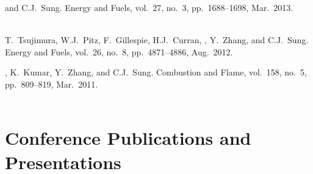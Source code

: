 \begin{bibmune}
    \item {} and C.J.\ Sung.  Energy and Fuels, vol.\ 27, no.\ 3,
    pp.\ 1688--1698, Mar.\ 2013.\\
    \\

    \item T.\ Tsujimura, W.J.\ Pitz, F.\ Gillespie, H.J.\ Curran, ,
    Y.\ Zhang, and C.J.\ Sung.  Energy and Fuels,
    vol.\ 26, no.\ 8, pp.\ 4871--4886, Aug.\ 2012.\\

    \item {}, K.\ Kumar, Y.\ Zhang, and C.J.\ Sung.
     Combustion and Flame, vol.\ 158, no.\ 5, pp.\ 809--819, Mar.\ 2011.\\
    \\
\end{bibmune}

\section{{\sectionfont Conference Publications and Presentations}}

